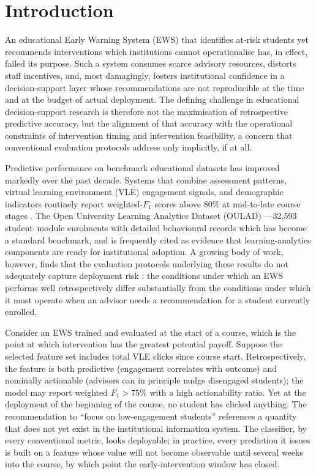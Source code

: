 \documentclass[a4paper,fleqn]{cas-sc}
\begin{document}
\maketitle

\section{Introduction}
\label{sec:intro}

An educational Early Warning System (EWS) that identifies at-risk students yet recommends interventions which institutions cannot operationalise has, in effect, failed its purpose. Such a system consumes scarce advisory resources, distorts staff incentives, and, most damagingly, fosters institutional confidence in a decision-support layer whose recommendations are not reproducible at the time and at the budget of actual deployment. The defining challenge in educational decision-support research is therefore not the maximisation of retrospective predictive accuracy, but the alignment of that accuracy with the operational constraints of intervention timing and intervention feasibility, a concern that conventional evaluation protocols address only implicitly, if at all.

Predictive performance on benchmark educational datasets has improved markedly over the past decade. Systems that combine assessment patterns, virtual learning environment (VLE) engagement signals, and demographic indicators routinely report weighted-$F_1$ scores above $80\%$ at
mid-to-late course stages \citep{hlosta2017,waheed2020}. The Open University Learning Analytics Dataset (OULAD) \citep{kuzilek2017}---32{,}593 student--module enrolments with detailed behavioural records which has become a standard benchmark, and is frequently cited as evidence that learning-analytics components are ready for institutional adoption. A growing body of work, however, finds that the evaluation protocols underlying these results do not adequately capture
deployment risk \citep{gardner2018,chen2020,rizvi2019,hussain2019}: the conditions under which an EWS performs well retrospectively differ substantially from the conditions under which it must operate when an advisor needs a recommendation for a student currently enrolled.

Consider an EWS trained and evaluated at the start of a course, which is the point at which intervention has the greatest potential payoff. Suppose the selected feature set includes total VLE clicks since course start. Retrospectively, the feature is both predictive (engagement correlates
with outcome) and nominally actionable (advisors can in principle nudge disengaged students); the model may report weighted $F_1 > 75\%$ with a high actionability ratio. Yet at the deployment of the beginning of the course, no student has clicked anything. The recommendation to ``focus on low-engagement students'' references a quantity that does not yet exist in the institutional information system. The classifier, by every conventional metric, looks deployable; in practice, every prediction it issues is built on a feature whose value will not become observable until several weeks into the course, by which point the early-intervention window has closed.
\end{document}
